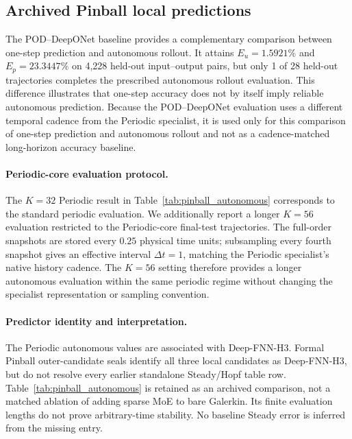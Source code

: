 \subsection{Archived Pinball local predictions}
\label{app:pinball}

The POD--DeepONet baseline provides a complementary comparison between
one-step prediction and autonomous rollout. It attains $E_u=1.5921\%$ and $E_p=23.3447\%$ on 4,228 held-out input--output pairs, but only 1 of 28 held-out trajectories completes the prescribed autonomous rollout evaluation. This difference illustrates that one-step accuracy does not by itself imply reliable autonomous prediction. Because the POD--DeepONet evaluation uses a different temporal cadence from
the Periodic specialist, it is used only for this comparison of one-step prediction and autonomous rollout and not as a cadence-matched long-horizon accuracy baseline.

\paragraph{Periodic-core evaluation protocol.}
The $K=32$ Periodic result in Table~\ref{tab:pinball_autonomous} corresponds to the standard periodic evaluation. We additionally report a longer $K=56$ evaluation restricted to the Periodic-core final-test trajectories. The full-order snapshots are stored every $0.25$ physical time units; subsampling every fourth snapshot gives an effective interval $\Delta t=1$, matching the Periodic specialist's native history cadence. The $K=56$ setting therefore provides a longer autonomous evaluation within the same periodic regime without changing the specialist representation or
sampling convention.


\paragraph{Predictor identity and interpretation.}
The Periodic autonomous values are associated with Deep-FNN-H3.
Formal Pinball outer-candidate seals identify all three local
candidates as Deep-FNN-H3, but do not resolve every earlier standalone
Steady/Hopf table row. Table~\ref{tab:pinball_autonomous} is retained
as an archived comparison, not a matched ablation of adding sparse
MoE to bare Galerkin. Its finite evaluation lengths do not prove
arbitrary-time stability. No baseline Steady error is inferred from
the missing entry.
